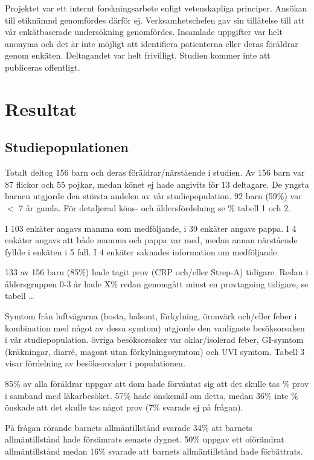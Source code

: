 \documentclass[12pt,twocolumn]{article}
\begin{document}
Projektet var ett internt forskningsarbete enligt vetenskapliga principer.
Ans\"okan till etikn\"amnd genomf\"ordes d\"arf\"or ej. Verksamhetschefen gav
sin till\r{a}telse till att v\r{a}r enk\"atbaserade unders\"okning
genomf\"ordes. Insamlade uppgifter var helt anonyma och det \"ar inte m\"ojligt
att identifiera patienterna eller deras f\"or\"aldrar genom enk\"aten.
Deltagandet var helt frivilligt. Studien kommer inte att publiceras offentligt.

\section{Resultat}

\subsection{Studiepopulationen}
Totalt deltog 156 barn och deras f\"or\"aldrar/n\"arst\r{a}ende i studien. Av
156 barn var 87 flickor och 55 pojkar, medan k\"onet ej hade angivits f\"or 13
deltagare. De yngsta barnen utgjorde den st\"orsta andelen av v\r{a}r
studiepopulation. 92 barn (59\%) var $<$ 7 \r{a}r gamla. F\"or detaljerad
k\"ons- och \r{a}ldersf\"ordelning se \% tabell 1 och 2.

I 103 enk\"ater angavs mamma som medf\"oljande, i 39 enk\"ater angavs pappa. I 4
enk\"ater angavs att b\r{a}de mamma och pappa var med, medan annan
n\"arst\r{a}ende fyllde i enk\"aten i 5 fall. I 4 enk\"ater  saknades
information om medf\"oljande.

133 av 156 barn (85\%) hade tagit prov (CRP och/eller Strep-A) tidigare. Redan i
\r{a}ldersgruppen 0-3 \r{a}r hade X\% redan genomg\r{a}tt minst en provtagning
tidigare, se tabell …

Symtom fr\r{a}n luftv\"agarna (hosta, halsont, f\"orkylning, \"oronv\"ark
och/eller feber i kombination med n\r{a}got av dessa symtom) utgjorde den
vanligaste bes\"oksorsaken i v\r{a}r studiepopulation. \"ovriga bes\"oksorsaker
var oklar/isolerad feber, GI-symtom (kr\"akningar, diarré, magont utan
f\"orkylningssymtom) och UVI symtom. Tabell 3 visar f\"ordelning av
bes\"oksorsaker i populationen.

85\% av alla f\"or\"aldrar uppgav att dom hade f\"orv\"antat sig att det skulle
tas \% prov i samband med l\"akarbes\"oket. 57\% hade \"onskem\r{a}l om detta,
medan 36\% inte \% \"onskade att det skulle tas n\r{a}got prov (7\% svarade ej
p\r{a} fr\r{a}gan).

P\r{a} fr\r{a}gan r\"orande barnets allm\"antillst\r{a}nd svarade 34\% att
barnets allm\"antillst\r{a}nd hade f\"ors\"amrats senaste dygnet. 50\% uppgav
ett of\"or\"andrat allm\"antillst\r{a}nd medan 16\% svarade att barnets
allm\"antillst\r{a}nd hade f\"orb\"attrats.
\end{document}
